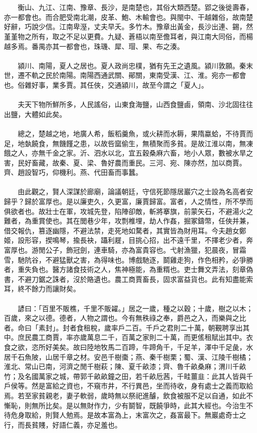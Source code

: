 \\\\
　　衡山、九江、江南、豫章、長沙，是南楚也，其俗大類西楚。郢之後徙壽春，亦一都會也。而合肥受南北潮，皮革、鮑、木輸會也。與閩中、干越雜俗，故南楚好辭，巧說少信。江南卑溼，丈夫早夭。多竹木。豫章出黃金，長沙出連、錫，然堇堇物之所有，取之不足以更費。九疑、蒼梧以南至儋耳者，與江南大同俗，而楊越多焉。番禺亦其一都會也，珠璣、犀、瑁、果、布之湊。
\\\\
　　潁川、南陽，夏人之居也。夏人政尚忠樸，猶有先王之遺風。潁川敦願。秦末世，遷不軌之民於南陽。南陽西通武關、鄖關，東南受漢、江、淮。宛亦一都會也。俗雜好事，業多賈。其任俠，交通潁川，故至今謂之「夏人」。
\\\\
　　夫天下物所鮮所多，人民謠俗，山東食海鹽，山西食鹽鹵，領南、沙北固往往出鹽，大體如此矣。
\\\\
　　總之，楚越之地，地廣人希，飯稻羹魚，或火耕而水耨，果隋蠃蛤，不待賈而足，地埶饒食，無饑饉之患，以故呰窳偷生，無積聚而多貧。是故江淮以南，無凍餓之人，亦無千金之家。沂、泗水以北，宜五穀桑麻六畜，地小人眾，數被水旱之害，民好畜藏，故秦、夏、梁、魯好農而重民。三河、宛、陳亦然，加以商賈。齊、趙設智巧，仰機利。燕、代田畜而事蠶。
\\\\
　　由此觀之，賢人深謀於廊廟，論議朝廷，守信死節隱居巖穴之士設為名高者安歸乎？歸於富厚也。是以廉吏久，久更富，廉賈歸富。富者，人之情性，所不學而俱欲者也。故壯士在軍，攻城先登，陷陣卻敵，斬將搴旗，前蒙矢石，不避湯火之難者，為重賞使也。其在閭巷少年，攻剽椎埋，劫人作姦，掘冢鑄幣，任俠并兼，借交報仇，篡逐幽隱，不避法禁，走死地如騖者，其實皆為財用耳。今夫趙女鄭姬，設形容，揳鳴琴，揄長袂，躡利屣，目挑心招，出不遠千里，不擇老少者，奔富厚也。游閒公子，飾冠劍，連車騎，亦為富貴容也。弋射漁獵，犯晨夜，冒霜雪，馳阬谷，不避猛獸之害，為得味也。博戲馳逐，鬬雞走狗，作色相矜，必爭勝者，重失負也。醫方諸食技術之人，焦神極能，為重糈也。吏士舞文弄法，刻章偽書，不避刀鋸之誅者，沒於賂遺也。農工商賈畜長，固求富益貨也。此有知盡能索耳，終不餘力而讓財矣。
\\\\
　　諺曰：「百里不販樵，千里不販糴。」居之一歲，種之以穀；十歲，樹之以木；百歲，來之以德。德者，人物之謂也。今有無秩祿之奉，爵邑之入，而樂與之比者。命曰「素封」。封者食租稅，歲率戶二百。千戶之君則二十萬，朝覲聘享出其中。庶民農工商賈，率亦歲萬息二千，百萬之家則二十萬，而更傜租賦出其中。衣食之欲，恣所好美矣。故曰陸地牧馬二百蹄，牛蹄角千，千足羊，澤中千足彘，水居千石魚陂，山居千章之材。安邑千樹棗；燕、秦千樹栗；蜀、漢、江陵千樹橘；淮北、常山已南，河濟之閒千樹萩；陳、夏千畝漆；齊、魯千畝桑麻；渭川千畝竹；及名國萬家之城，帶郭千畝畝鐘之田，若千畝卮茜，千畦薑韭：此其人皆與千戶侯等。然是富給之資也，不窺市井，不行異邑，坐而待收，身有處士之義而取給焉。若至家貧親老，妻子軟弱，歲時無以祭祀進醵，飲食被服不足以自通，如此不慚恥，則無所比矣。是以無財作力，少有鬬智，既饒爭時，此其大經也。今治生不待危身取給，則賢人勉焉。是故本富為上，末富次之，姦富最下。無巖處奇士之行，而長貧賤，好語仁義，亦足羞也。
